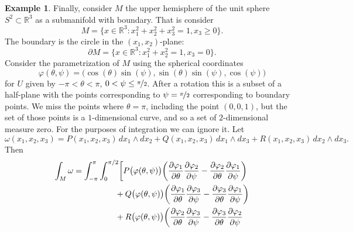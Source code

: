 \documentclass[12pt,openany]{book}
\newcommand{\R}{{\mathbb{R}}}
\theoremstyle{plain}
\theoremstyle{remark}
\theoremstyle{definition}
\theoremstyle{exercise}
\theoremstyle{example}
\newtheorem{example}[thm]{Example}
\begin{document}
\begin{example}
Finally, consider $M$
the upper hemisphere of the unit sphere $S^2 \subset \R^3$ as a submanifold
with boundary.  That is consider
\begin{equation*}
M = \bigl\{ x \in \R^3 : x_1^2+x_2^2+x_3^2=1, x_3 \geq 0 \bigr\} .
\end{equation*}
The boundary is the circle in the $(x_1,x_2)$-plane:
\begin{equation*}
\partial M = \bigl\{ x \in \R^3 : x_1^2+x_2^2=1, x_3 = 0 \bigr\} .
\end{equation*}
Consider the parametrization of $M$ using the spherical coordinates
\begin{equation*}
\varphi(\theta,\psi) =
\bigl(\cos(\theta) \sin(\psi),
 \sin(\theta) \sin(\psi),
 \cos(\psi)\bigr)
\end{equation*}
for $U$ given by $-\pi < \theta < \pi$, $0 < \psi \leq \nicefrac{\pi}{2}$.  After
a rotation this is a subset of a half-plane with the points corresponding to
$\psi = \nicefrac{\pi}{2}$ corresponding to boundary points.  We miss the
points where $\theta = \pi$, including the point $(0,0,1)$, but the set of
those points is a $1$-dimensional curve, and so a set of $2$-dimensional
measure zero. For the purposes of integration we can ignore it.
Let
\begin{equation*}
\omega(x_1,x_2,x_3) =
P(x_1,x_2,x_3) \, dx_1 \wedge dx_2
+ Q(x_1,x_2,x_3) \, dx_1 \wedge dx_3
+ R(x_1,x_2,x_3) \, dx_2 \wedge dx_3 .
\end{equation*}
Then
\begin{equation*}
\begin{split}
\int_M \omega & = 
\int_{-\pi}^\pi
\int_{0}^{\pi/2}
\biggl[
P\bigl(\varphi(\theta,\psi)\bigr) \biggl(
\frac{\partial \varphi_1}{\partial \theta}
\frac{\partial \varphi_2}{\partial \psi}
-
\frac{\partial \varphi_2}{\partial \theta}
\frac{\partial \varphi_1}{\partial \psi}
\biggr)
\\
& \hspace{1.8cm}
+
Q\bigl(\varphi(\theta,\psi)\bigr) \biggl(
\frac{\partial \varphi_1}{\partial \theta}
\frac{\partial \varphi_3}{\partial \psi}
-
\frac{\partial \varphi_3}{\partial \theta}
\frac{\partial \varphi_1}{\partial \psi}
\biggr)
\\
& \hspace{1.8cm}
+
R\bigl(\varphi(\theta,\psi)\bigr) \biggl(
\frac{\partial \varphi_2}{\partial \theta}
\frac{\partial \varphi_3}{\partial \psi}
-
\frac{\partial \varphi_3}{\partial \theta}
\frac{\partial \varphi_2}{\partial \psi}

\end{split}
\end{equation*}
\end{example}
\end{document}
